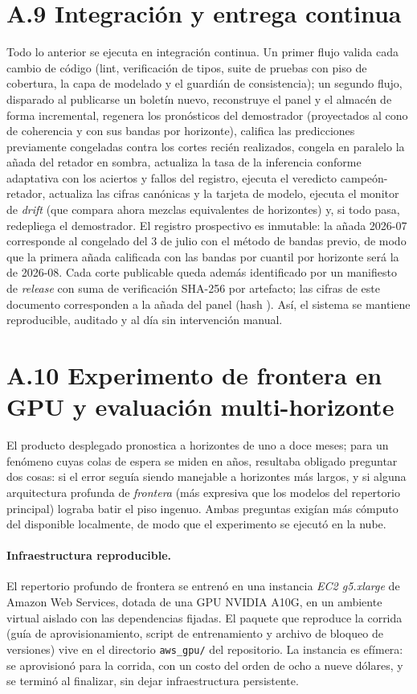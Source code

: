 \documentclass[12pt,letterpaper]{report}
\begin{document}
\section{A.9 Integraci\'on y entrega continua}

Todo lo anterior se ejecuta en integraci\'on continua. Un primer flujo valida cada cambio de
c\'odigo (lint, verificaci\'on de tipos, suite de pruebas con piso de cobertura, la capa de
modelado y el guardi\'an de consistencia); un segundo flujo, disparado al publicarse un
bolet\'in nuevo, reconstruye el panel y el almac\'en de forma incremental, regenera los
pron\'osticos del demostrador (proyectados al cono de coherencia y con sus bandas por
horizonte), califica las predicciones previamente congeladas contra los cortes reci\'en
realizados, congela en paralelo la a\~nada del retador en sombra, actualiza la tasa de la
inferencia conforme adaptativa con los aciertos y fallos del registro, ejecuta el
veredicto campe\'on-retador, actualiza las cifras canónicas y la tarjeta de modelo,
ejecuta el monitor de \textit{drift} (que compara ahora mezclas equivalentes de
horizontes) y, si todo pasa, redepliega el demostrador. El registro prospectivo es
inmutable: la a\~nada 2026-07 corresponde al congelado del 3 de julio con el m\'etodo de
bandas previo, de modo que la primera a\~nada calificada con las bandas por cuantil por
horizonte ser\'a la de 2026-08. Cada corte publicable queda adem\'as identificado por un
manifiesto de \textit{release} con suma de verificaci\'on SHA-256 por artefacto; las
cifras de este documento corresponden a la a\~nada \factPanelVintage{} del panel
(hash \factPanelHashShort). As\'i, el sistema se
mantiene reproducible, auditado y al d\'ia sin intervenci\'on manual.

\section{A.10 Experimento de frontera en GPU y evaluación multi-horizonte}

El producto desplegado pronostica a horizontes de uno a doce meses; para un fenómeno cuyas
colas de espera se miden en años, resultaba obligado preguntar dos cosas: si el error seguía
siendo manejable a horizontes más largos, y si alguna arquitectura profunda de \textit{frontera}
(más expresiva que los modelos del repertorio principal) lograba batir el piso ingenuo. Ambas
preguntas exigían más cómputo del disponible localmente, de modo que el experimento se ejecutó
en la nube.

\paragraph{Infraestructura reproducible.} El repertorio profundo de frontera se entrenó en una
instancia \textit{EC2 g5.xlarge} de Amazon Web Services, dotada de una GPU NVIDIA A10G, en un
ambiente virtual aislado con las dependencias fijadas. El paquete que reproduce la corrida
(guía de aprovisionamiento, script de entrenamiento y archivo de bloqueo de versiones) vive en
el directorio \texttt{aws\_gpu/} del repositorio. La instancia es efímera: se aprovisionó para
la corrida, con un costo del orden de ocho a nueve dólares, y se terminó al finalizar, sin dejar
infraestructura persistente.
\end{document}
